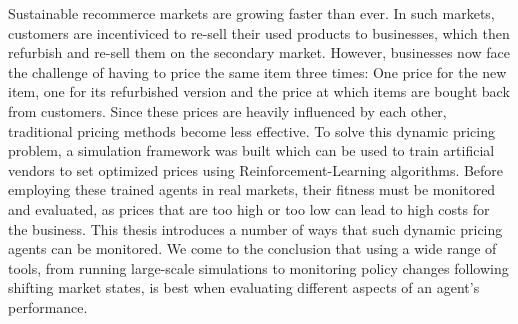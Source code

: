 Sustainable recommerce markets are growing faster than ever. In such markets, customers are incentiviced to re-sell their used products to businesses, which then refurbish and re-sell them on the secondary market. However, businesses now face the challenge of having to price the same item three times: One price for the new item, one for its refurbished version and the price at which items are bought back from customers. Since these prices are heavily influenced by each other, traditional pricing methods become less effective. To solve this dynamic pricing problem, a simulation framework was built which can be used to train artificial vendors to set optimized prices using Reinforcement-Learning algorithms.
Before employing these trained agents in real markets, their fitness must be monitored and evaluated, as prices that are too high or too low can lead to high costs for the business. This thesis introduces a number of ways that such dynamic pricing agents can be monitored. We come to the conclusion that using a wide range of tools, from running large-scale simulations to monitoring policy changes following shifting market states, is best when evaluating different aspects of an agent's performance.